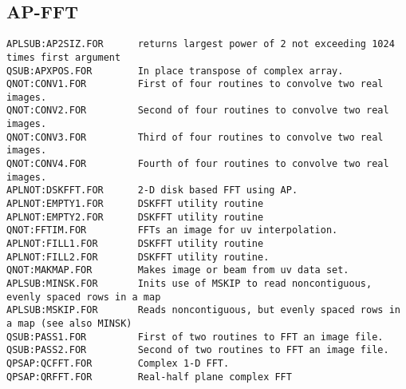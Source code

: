 \subsection{AP-FFT}
\begin{verbatim}
APLSUB:AP2SIZ.FOR      returns largest power of 2 not exceeding 1024 times first argument
QSUB:APXPOS.FOR        In place transpose of complex array.
QNOT:CONV1.FOR         First of four routines to convolve two real images.
QNOT:CONV2.FOR         Second of four routines to convolve two real images.
QNOT:CONV3.FOR         Third of four routines to convolve two real images.
QNOT:CONV4.FOR         Fourth of four routines to convolve two real images.
APLNOT:DSKFFT.FOR      2-D disk based FFT using AP.
APLNOT:EMPTY1.FOR      DSKFFT utility routine
APLNOT:EMPTY2.FOR      DSKFFT utility routine
QNOT:FFTIM.FOR         FFTs an image for uv interpolation.
APLNOT:FILL1.FOR       DSKFFT utility routine
APLNOT:FILL2.FOR       DSKFFT utility routine.
QNOT:MAKMAP.FOR        Makes image or beam from uv data set.
APLSUB:MINSK.FOR       Inits use of MSKIP to read noncontiguous, evenly spaced rows in a map
APLSUB:MSKIP.FOR       Reads noncontiguous, but evenly spaced rows in a map (see also MINSK)
QSUB:PASS1.FOR         First of two routines to FFT an image file.
QSUB:PASS2.FOR         Second of two routines to FFT an image file.
QPSAP:QCFFT.FOR        Complex 1-D FFT.
QPSAP:QRFFT.FOR        Real-half plane complex FFT
\end{verbatim}
 

